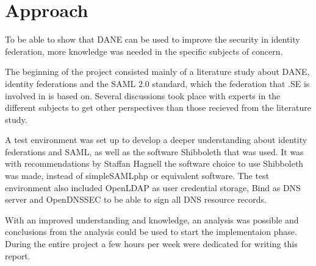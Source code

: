 \section{Approach}
To be able to show that DANE can be used to improve the security in identity federation, more knowledge was needed in the specific subjects of concern.

The beginning of the project consisted mainly of a literature study about DANE, identity federations and the SAML 2.0 standard, which the federation that .SE is involved in is based on. 
Several discussions took place with experts in the different subjects to get other perspectives than those recieved from the literature study.

A test environment was set up to develop a deeper understanding about identity federations and SAML, as well as the software 
Shibboleth that was used. 
It was with recommendations by Staffan Hagnell the software choice to use Shibboleth was made, instead of simpleSAMLphp or equivalent software.
The test environment also included OpenLDAP as user credential storage, Bind as DNS server and OpenDNSSEC to be able to sign all DNS resource records.

With an improved understanding and knowledge, an analysis was possible and conclusions from the analysis could be used 
to start the implementaion phase. During the entire project a few hours per week were dedicated for writing this report.



 


